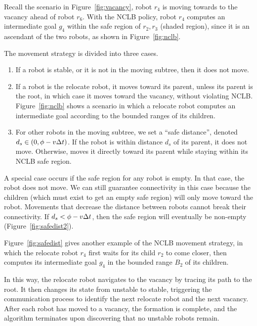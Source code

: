 Recall the scenario in Figure~\ref{fig:vacancy}, robot $r_4$ is moving towards to the vacancy ahead of robot $r_6$. 
%
With the NCLB policy, robot $r_4$ computes an intermediate goal $g_4$ within the safe region of $r_2, r_3$ (shaded region), since it is an ascendant of the two robots, as shown in Figure~\ref{fig:nclb}.

The movement strategy is divided into three cases.
\begin{enumerate}
  \item If a robot is stable, or it is not in the moving subtree, then it does
  not move.

  \item If a robot is the relocate robot, it moves
  toward its parent, unless its parent is the root, in which case it moves
  toward the vacancy, without violating NCLB.
  Figure~\ref{fig:nclb} shows a scenario in which a relocate robot
  computes an intermediate goal according to the bounded ranges of its
  children.

  \item For other robots in the moving subtree, we set a ``safe distance'',
  denoted $d_s \in (0, \phi-v\Delta t)$.  If the robot is within distance $d_s$ of
  its parent, it does not move.  Otherwise, moves it directly toward its parent
  while staying within its NCLB safe region.
\end{enumerate}

A special case occurs if the safe region for any robot is empty.
%
In that case, the robot does not move.  
%
We can still guarantee connectivity in this case
because the children (which must exist to get an empty safe region) will only
move toward the robot.  
%
Movements that decrease the distance between robots
cannot break their connectivity.  
%
If \hbox{$d_s < \phi - v\Delta t$}, then the safe
region will eventually be non-empty (Figure~\ref{fig:safedist2}).

Figure~\ref{fig:safedist} gives another example of the NCLB movement strategy,
in which the relocate robot $r_4$ first waits for its child $r_2$ to come closer, then
computes its intermediate goal $g_4$ in the bounded range $B_2$ of its children.


In this way, the relocate robot navigates to the vacancy by tracing its path to the root.  
%
It then changes its
state from unstable to stable, triggering the communication process to identify
the next relocate robot and the next vacancy.  
%
After each robot has moved to a
vacancy, the formation is complete, and the algorithm terminates upon
discovering that no unstable robots remain.

